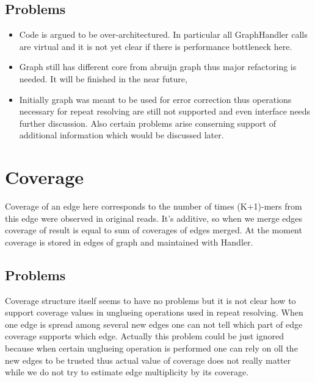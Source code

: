 \documentclass[14pt]{article}
\begin{document}
\subsection{Problems}
\begin{itemize}
\item Code is argued to be over-architectured. In particular all GraphHandler calls are virtual and it is not yet clear if there is performance bottleneck here.
\item Graph still has different core from abruijn graph thus major refactoring is needed. It will be finished in the near future,
\item Initially graph was meant to be used for error correction thus operations necessary for repeat resolving are still not supported and even interface needs further discussion. Also certain problems arise conserning support of additional information which would be discussed later.
\end{itemize}


\section{Coverage}

Coverage of an edge here corresponds to the number of times (K+1)-mers from this edge were observed in original reads. It's additive, so when we merge edges coverage of result is equal to sum of coverages of edges merged. At the moment coverage is stored in edges of graph and maintained with Handler.

\subsection{Problems}

Coverage structure itself seems to have no problems but it is not clear how to support coverage values in unglueing operations used in repeat resolving. When one edge is spread among several new edges one can not tell which part of edge coverage supports which edge. Actually this problem could be just ignored because when certain unglueing operation is performed one can rely on oll the new edges to be trusted thus actual value of coverage does not really matter while we do not try to estimate edge multiplicity by its coverage.
\end{document}
